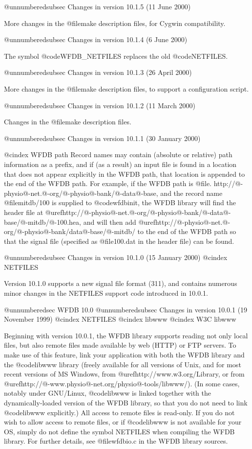 {{{{{{{{@unnumberedsubsec Changes in version 10.1.5 (11 June 2000)

More changes in the @file{make} description files, for Cygwin compatibility.

@unnumberedsubsec Changes in version 10.1.4 (6 June 2000)

The symbol @code{WFDB_NETFILES} replaces the old @code{NETFILES}.

@unnumberedsubsec Changes in version 10.1.3 (26 April 2000)

More changes in the @file{make} description files, to support a configuration
script.

@unnumberedsubsec Changes in version 10.1.2 (11 March 2000)

Changes in the @file{make} description files.

@unnumberedsubsec Changes in version 10.1.1 (30 January 2000)

@cindex WFDB path
Record names may contain (absolute or relative) path information as a prefix,
and if (as a result) an input file is found in a location that does not appear
explicitly in the WFDB path, that location is appended to the end of the WFDB
path.  For example, if the WFDB path is
@file{. http://@-physio@-net.@-org/@-physio@-bank/@-data@-base}, and the
record name @file{mitdb/100} is supplied to @code{wfdbinit}, the WFDB library
will find the header file at
@uref{http://@-physio@-net.@-org/@-physio@-bank/@-data@-base/@-mitdb/@-100.hea},
and will then add @uref{http://@-physio@-net.@-org/@-physio@-bank/data@-base/@-mitdb/} to
the end of the WFDB path so that the signal file (specified as @file{100.dat}
in the header file) can be found.

@unnumberedsubsec Changes in version 10.1.0 (15 January 2000)
@cindex NETFILES

Version 10.1.0 supports a new signal file format (311), and contains
numerous minor changes in the NETFILES support code introduced in 10.0.1.

@unnumberedsec WFDB 10.0
@unnumberedsubsec Changes in version 10.0.1 (19 November 1999)
@cindex NETFILES
@cindex libwww
@cindex W3C libwww

Beginning with version 10.0.1, the WFDB library supports reading not only local
files, but also remote files made available by web (HTTP) or FTP servers.  To
make use of this feature, link your application with both the WFDB library and
the @code{libwww} library (freely available for all versions of Unix, and for
most recent versions of MS Windows, from @uref{http://www.w3.org/Library}, or
from @uref{http://@-www.physio@-net.org/physio@-tools/libwww/}).  (In some
cases, notably under GNU/Linux, @code{libwww} is linked together with the
dynamically-loaded version of the WFDB library, so that you do not need to link
@code{libwww} explicitly.)  All access to remote files is read-only.  If you do
not wish to allow access to remote files, or if @code{libwww} is not available
for your OS, simply do not define the symbol NETFILES when compiling the WFDB
library.  For further details, see @file{wfdbio.c} in the WFDB library sources.

}}}}}}}}
